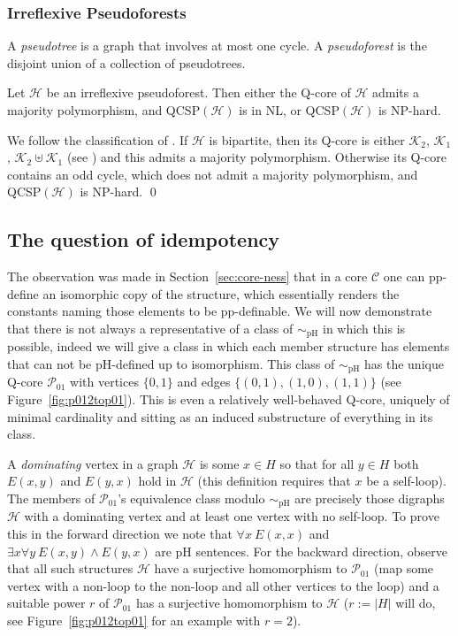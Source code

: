 \documentclass{LMCS}
\begin{document}
\subsubsection{Irreflexive Pseudoforests}

A \emph{pseudotree} is a graph that involves at most one cycle. A \emph{pseudoforest} is the disjoint union of a collection of pseudotrees.
\begin{prop}
Let $\mathcal{H}$ be an irreflexive pseudoforest. Then either the Q-core of $\mathcal{H}$ admits a majority polymorphism, and QCSP$(\mathcal{H})$ is in NL, or QCSP$(\mathcal{H})$ is NP-hard.
\end{prop}
\proof
We follow the classification of \cite{CiE2006}. If $\mathcal{H}$ is bipartite, then its Q-core is either $\mathcal{K}_2$, $\mathcal{K}_1$, $\mathcal{K}_2 \uplus \mathcal{K}_1$ (see \cite{LICS2008}) and this admits a majority polymorphism. Otherwise its Q-core contains an odd cycle, which does not admit a majority polymorphism, and QCSP$(\mathcal{H})$ is NP-hard.
\qed

\subsection{The question of idempotency}

The observation was made in Section~\ref{sec:core-ness} that in a core $\mathcal{C}$ one can pp-define an isomorphic copy of the structure, which essentially renders the constants naming those elements to be pp-definable. We will now demonstrate that there is not always a representative of a class of $\sim_{\mathrm{pH}}$ in which this is possible, indeed we will give a class in which each member structure has elements that can not be pH-defined up to isomorphism. This class of $\sim_{\mathrm{pH}}$ has the unique Q-core $\mathcal{P}_{01}$ with vertices $\{0,1\}$ and edges $\{(0,1),(1,0),(1,1)\}$ (see Figure~\ref{fig:p012top01}). This is even a relatively well-behaved Q-core, uniquely of minimal cardinality and sitting as an induced substructure of everything in its class. 

A \emph{dominating} vertex in a graph $\mathcal{H}$ is some $x \in H$ so that for all $y \in H$ both $E(x,y)$ and $E(y,x)$ hold in $\mathcal{H}$ (this definition requires that $x$ be a self-loop). 
The members of $\mathcal{P}_{01}$'s equivalence class modulo $\sim_{\mathrm{pH}}$ are precisely those digraphs $\mathcal{H}$ with a dominating vertex and at least one vertex with no self-loop. To prove this in the forward direction we note that $\forall x \ E(x,x)$ and $\exists x \forall y \ E(x,y) \wedge E(y,x)$ are pH sentences. For the backward direction, observe that all such structures $\mathcal{H}$ have a surjective homomorphism to $\mathcal{P}_{01}$ (map some vertex with a non-loop to the non-loop and all other vertices to the loop) and a suitable power $r$ of $\mathcal{P}_{01}$ has a surjective homomorphism to $\mathcal{H}$ ($r:=|H|$ will do, see Figure~\ref{fig:p012top01} for an example with $r=2$).
\end{document}
